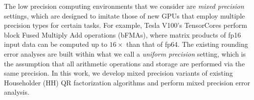 The low precision computing environments that we consider are \emph{mixed precision} settings, which are designed to imitate those of new GPUs that employ multiple precision types for certain tasks. 
For example, Tesla V100's TensorCores perform block Fused Multiply Add operations (bFMAs), where matrix products of fp16 input data can be computed up to $16\times$ than that of fp64.
The existing rounding error analyses are built within what we call a \emph{uniform precision} setting, which is the assumption that all arithmetic operations and storage are performed via the same precision.
In this work, we develop mixed precision variants of existing Householder (HH) QR factorization algorithms and perform mixed precision error analysis. 

